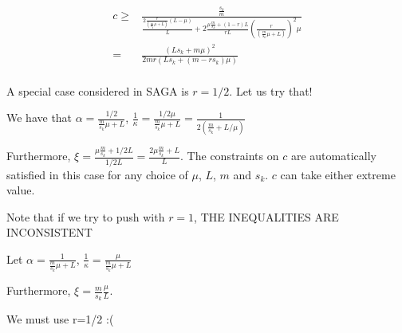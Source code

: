 \documentclass[12pt]{article}
\begin{document}
		\begin{align*}
		c \geq &  \frac{\frac{s_k}{m}}{\frac{2 \frac{r}{(\frac{m}{s_k}\mu+L)}(L - \mu)}{L}+ 2 \frac{\mu \frac{m}{s_k}+(1-r)L}{r L } (\frac{r}{(\frac{m}{s_k}\mu+L)})^2 \mu }\\
		 =& \frac{(L s_k + m \mu )^2}{2 m r(L s_k + (m - r s_k)\mu)}\\
		\end{align*}
		
		
		A special case considered in SAGA is $r=1/2$. Let us try that!
		
		We have that $\alpha = \frac{1/2}{\frac{m}{s_k}\mu+L}$, $\frac{1}{\kappa} = \frac{1/2 \mu}{ \frac{m}{s_k}\mu+L}=\frac{1}{2( \frac{m}{s_k}+L/\mu)}$
		
		Furthermore, $\xi =\frac{\mu \frac{m}{s_k}+1/2L}{1/2 L }  = \frac{2 \mu \frac{m}{s_k}+L}{ L }$. The constraints on $c$ are automatically satisfied in this case for any choice of $\mu$, $L$, $m$ and $s_k$. $c$ can take either extreme value. 
		
		
		\newpage
		
		
		Note that if we try to push with $r=1$, THE INEQUALITIES ARE INCONSISTENT 
		
		Let $\alpha = \frac{1}{\frac{m}{s_k}\mu+L}$, $\frac{1}{\kappa} = \frac{ \mu}{ \frac{m}{s_k}\mu+L}$
		
		Furthermore, $\xi =\frac{m}{s_k}\frac{\mu}{L } $.
		
		We must use r=1/2 :(
		
		
		
		
\end{document}
